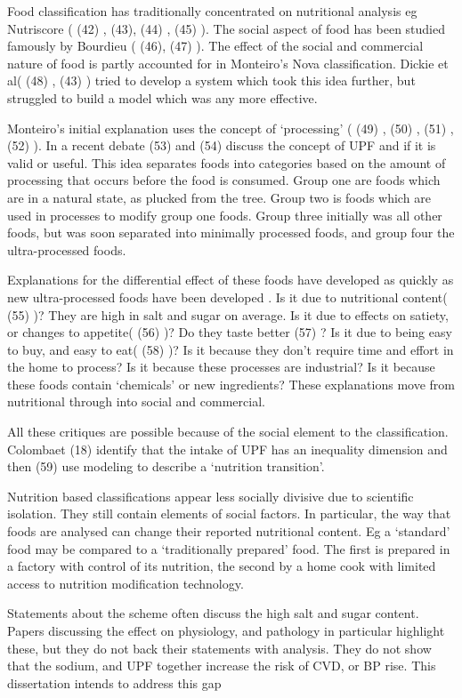 \documentclass[
]{article}
\begin{document}
Food classification has traditionally concentrated on nutritional
analysis eg Nutriscore ( (42) , (43), (44) , (45) ). The social aspect
of food has been studied famously by Bourdieu ( (46), (47) ). The effect
of the social and commercial nature of food is partly accounted for in
Monteiro's Nova classification. Dickie et al( (48) , (43) ) tried to
develop a system which took this idea further, but struggled to build a
model which was any more effective.

Monteiro's initial explanation uses the concept of `processing' ( (49) ,
(50) , (51) , (52) ). In a recent debate (53) and (54) discuss the
concept of UPF and if it is valid or useful. This idea separates foods
into categories based on the amount of processing that occurs before the
food is consumed. Group one are foods which are in a natural state, as
plucked from the tree. Group two is foods which are used in processes to
modify group one foods. Group three initially was all other foods, but
was soon separated into minimally processed foods, and group four the
ultra-processed foods.

Explanations for the differential effect of these foods have developed
as quickly as new ultra-processed foods have been developed . Is it due
to nutritional content( (55) )? They are high in salt and sugar on
average. Is it due to effects on satiety, or changes to appetite( (56)
)? Do they taste better (57) ? Is it due to being easy to buy, and easy
to eat( (58) )? Is it because they don't require time and effort in the
home to process? Is it because these processes are industrial? Is it
because these foods contain `chemicals' or new ingredients? These
explanations move from nutritional through into social and commercial.

All these critiques are possible because of the social element to the
classification. Colombaet (18) identify that the intake of UPF has an
inequality dimension and then (59) use modeling to describe a `nutrition
transition'.

Nutrition based classifications appear less socially divisive due to
scientific isolation. They still contain elements of social factors. In
particular, the way that foods are analysed can change their reported
nutritional content. Eg a `standard' food may be compared to a
`traditionally prepared' food. The first is prepared in a factory with
control of its nutrition, the second by a home cook with limited access
to nutrition modification technology.

Statements about the scheme often discuss the high salt and sugar
content. Papers discussing the effect on physiology, and pathology in
particular highlight these, but they do not back their statements with
analysis. They do not show that the sodium, and UPF together increase
the risk of CVD, or BP rise. This dissertation intends to address this
gap
\end{document}
